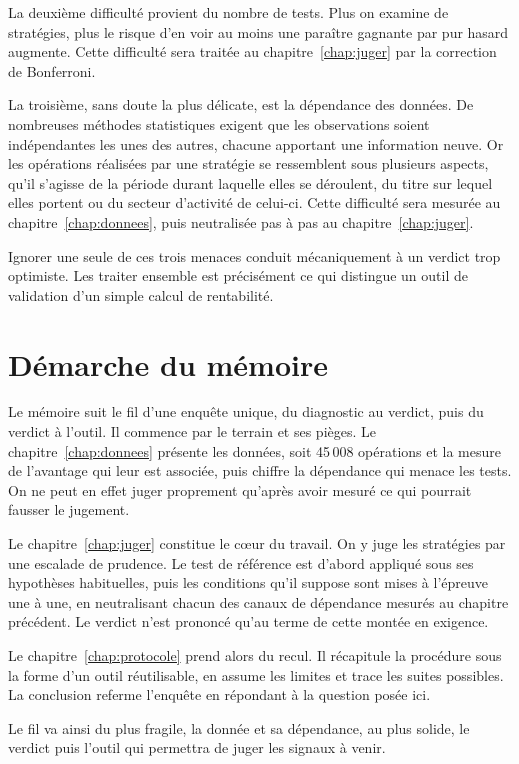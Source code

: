 La deuxième difficulté provient du nombre de tests. Plus on examine de
stratégies, plus le risque d'en voir au moins une paraître gagnante par pur
hasard augmente. Cette difficulté sera traitée au
chapitre~\ref{chap:juger} par la correction de Bonferroni.

La troisième, sans doute la plus délicate, est la dépendance des données. De
nombreuses méthodes statistiques exigent que les observations soient
indépendantes les unes des autres, chacune apportant une information neuve.
Or les opérations réalisées par une stratégie se ressemblent sous plusieurs
aspects, qu'il s'agisse de la période durant laquelle elles se déroulent, du
titre sur lequel elles portent ou du secteur d'activité de celui-ci. Cette
difficulté sera mesurée au chapitre~\ref{chap:donnees}, puis neutralisée pas
à pas au chapitre~\ref{chap:juger}.

Ignorer une seule de ces trois menaces conduit mécaniquement à un verdict
trop optimiste. Les traiter ensemble est précisément ce qui distingue un
outil de validation d'un simple calcul de rentabilité.

\section*{Démarche du mémoire}
\label{sec:planification}

Le mémoire suit le fil d'une enquête unique, du diagnostic au verdict, puis
du verdict à l'outil. Il commence par le terrain et ses pièges. Le
chapitre~\ref{chap:donnees} présente les données, soit 45\,008 opérations
et la mesure de l'avantage qui leur est associée, puis chiffre la dépendance
qui menace les tests. On ne peut en effet juger proprement qu'après avoir
mesuré ce qui pourrait fausser le jugement.

Le chapitre~\ref{chap:juger} constitue le cœur du travail. On y juge les
stratégies par une escalade de prudence. Le test de référence est d'abord
appliqué sous ses hypothèses habituelles, puis les conditions qu'il suppose
sont mises à l'épreuve une à une, en neutralisant chacun des canaux de
dépendance mesurés au chapitre précédent. Le verdict n'est prononcé qu'au
terme de cette montée en exigence.

Le chapitre~\ref{chap:protocole} prend alors du recul. Il récapitule la
procédure sous la forme d'un outil réutilisable, en assume les limites et
trace les suites possibles. La conclusion referme l'enquête en répondant à la
question posée ici.

Le fil va ainsi du plus fragile, la donnée et sa dépendance, au plus solide,
le verdict puis l'outil qui permettra de juger les signaux à venir.
